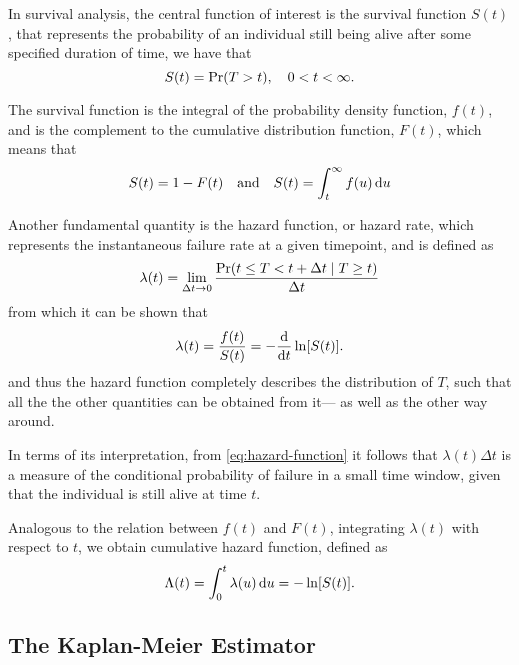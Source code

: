 In survival analysis, 
the central function of interest is 
the survival function \(S(t)\), 
that represents the probability 
of an individual still being alive after 
some specified duration of time, we have that 
%
\begin{equation}
    S(t) = \operatorname{\Pr} (T > t), \quad 0 < t < \infty.
\end{equation}

The survival function is 
the integral of the probability density function, \(f(t)\),
and is the complement to the cumulative distribution function, \(F(t)\),
which means that
~\autocite{kleinSurvival2003}
%
\begin{equation}
    S(t) = 1 - F(t) 
    \quad \text{and} \quad 
    S(t) = \int_{t}^{\infty} f(u) \, \mathrm{d} u
\end{equation}

Another fundamental quantity is the hazard function, or hazard rate,
which represents the instantaneous failure rate at a given timepoint,
and is defined as
%
\begin{equation}
    \label{eq:hazard-function}
    \lambda(t) = \lim_{\Delta t \to 0} 
        \frac{\PR (t \leq T < t + \Delta t \mid T \geq t)}{\Delta t}
\end{equation}
% 
from which it can be shown that
~\autocite{kleinSurvival2003}
%
\begin{equation}
    \lambda(t) = \frac{f(t)}{S(t)} = -\frac{\mathrm{d}}{\mathrm{d} t} \ln[S(t)].
\end{equation}
%
and thus the hazard function completely describes the distribution of \(T\),
such that all the the other quantities can be obtained from it---%
as well as the other way around.

In terms of its interpretation, 
from \cref{eq:hazard-function} it follows that \(\lambda(t)\Delta t\) 
is a measure of the conditional probability of failure in a small time
window, given that the individual is still alive at time \(t\).
~\autocite{kleinSurvival2003}

Analogous to the relation between \(f(t)\) and \(F(t)\), 
integrating \(\lambda(t)\) with respect to \(t\),
we obtain cumulative hazard function, defined as
%
\begin{equation}
    \Lambda(t) = \int_{0}^{t} \lambda(u) \, \mathrm{d} u = -\ln[S(t)].
\end{equation}

\subsection{The Kaplan-Meier Estimator}


